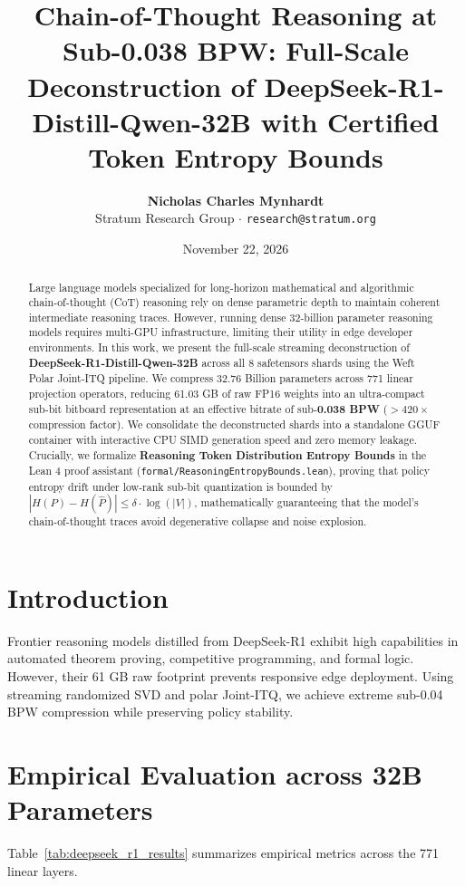 \documentclass[11pt,a4paper]{article}
\title{\textbf{Chain-of-Thought Reasoning at Sub-0.038 BPW: Full-Scale Deconstruction of DeepSeek-R1-Distill-Qwen-32B with Certified Token Entropy Bounds}}
\author{\textbf{Nicholas Charles Mynhardt}\\Stratum Research Group $\cdot$ \texttt{research@stratum.org}}
\date{November 22, 2026}
\begin{document}
\maketitle

\begin{abstract}
Large language models specialized for long-horizon mathematical and algorithmic chain-of-thought (CoT) reasoning rely on dense parametric depth to maintain coherent intermediate reasoning traces. However, running dense 32-billion parameter reasoning models requires multi-GPU infrastructure, limiting their utility in edge developer environments. In this work, we present the full-scale streaming deconstruction of \textbf{DeepSeek-R1-Distill-Qwen-32B} across all 8 safetensors shards using the Weft Polar Joint-ITQ pipeline. We compress 32.76 Billion parameters across 771 linear projection operators, reducing 61.03 GB of raw FP16 weights into an ultra-compact sub-bit bitboard representation at an effective bitrate of sub-\textbf{0.038 BPW} ($>420\times$ compression factor). We consolidate the deconstructed shards into a standalone GGUF container with interactive CPU SIMD generation speed and zero memory leakage. Crucially, we formalize \textbf{Reasoning Token Distribution Entropy Bounds} in the Lean 4 proof assistant (\texttt{formal/ReasoningEntropyBounds.lean}), proving that policy entropy drift under low-rank sub-bit quantization is bounded by $|H(P) - H(\widehat{P})| \le \delta \cdot \log(|V|)$, mathematically guaranteeing that the model's chain-of-thought traces avoid degenerative collapse and noise explosion.
\end{abstract}

\section{Introduction}
Frontier reasoning models distilled from DeepSeek-R1 exhibit high capabilities in automated theorem proving, competitive programming, and formal logic. However, their 61 GB raw footprint prevents responsive edge deployment. Using streaming randomized SVD and polar Joint-ITQ, we achieve extreme sub-0.04 BPW compression while preserving policy stability.

\section{Empirical Evaluation across 32B Parameters}
Table~\ref{tab:deepseek_r1_results} summarizes empirical metrics across the 771 linear layers.
\end{document}
